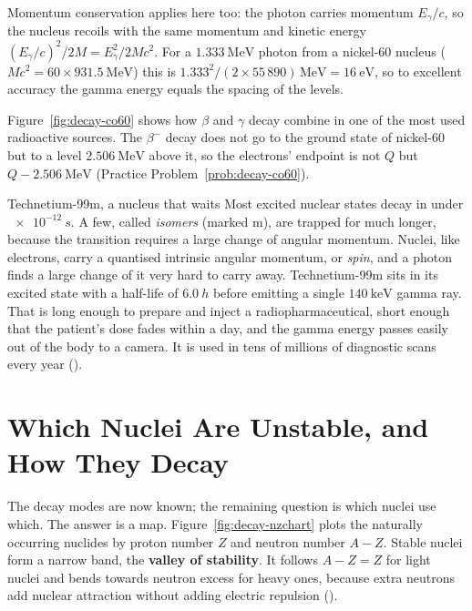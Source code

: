 Momentum conservation applies here too: the photon carries momentum $E_\gamma/c$, so the nucleus recoils
with the same momentum and kinetic energy $(E_\gamma/c)^2/2M=E_\gamma^2/2Mc^2$. For a $\SI{1.333}{\MeV}$
photon from a nickel-60 nucleus ($Mc^2=60\times\SI{931.5}{\MeV}$) this is
$1.333^2/(2\times55\,890)\,\si{\MeV}=\SI{16}{\eV}$, so to excellent accuracy the gamma energy equals the
spacing of the levels.

\begin{figure}[htbp]
\centering
{}
\end{figure}

Figure~\ref{fig:decay-co60} shows how $\beta$ and $\gamma$ decay combine in one of the most used
radioactive sources. The $\beta^-$ decay does not go to the ground state of nickel-60 but to a level
$\SI{2.506}{\MeV}$ above it, so the electrons' endpoint is not $Q$ but $Q-\SI{2.506}{\MeV}$
(Practice Problem~\ref{prob:decay-co60}).

\begin{remarkbox}{Technetium-99m, a nucleus that waits}
Most excited nuclear states decay in under $\SI{e-12}{s}$. A few, called \emph{isomers} (marked m), are
trapped for much longer, because the transition requires a large change of angular momentum. Nuclei,
like electrons, carry a quantised intrinsic angular momentum, or \emph{spin}, and a photon finds a large
change of it very hard to carry away. Technetium-99m sits in its excited state with a half-life of
$\SI{6.0}{h}$ before emitting a single $\SI{140}{\keV}$ gamma ray. That is long enough to prepare and inject
a radiopharmaceutical, short enough that the patient's dose fades within a day, and the gamma energy
passes easily out of the body to a camera. It is used in tens of millions of diagnostic scans every
year ().
\end{remarkbox}

\section{Which Nuclei Are Unstable, and How They Decay}\label{sec:decay-stability}

The decay modes are now known; the remaining question is which nuclei use which. The answer is a map.
Figure~\ref{fig:decay-nzchart} plots the naturally occurring nuclides by proton number $Z$ and neutron
number $A-Z$. Stable nuclei form a narrow band, the \textbf{valley of stability}. It follows $A-Z=Z$ for
light nuclei and bends towards neutron excess for heavy ones, because extra neutrons add nuclear
attraction without adding electric repulsion ().

